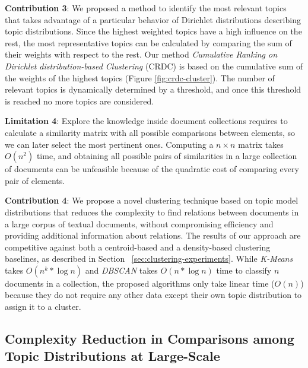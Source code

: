 \textbf{Contribution 3}: We proposed a method to identify the most relevant topics that takes advantage of a particular behavior of Dirichlet distributions describing topic distributions. Since the highest weighted topics have a high influence on the rest, the most representative topics can be calculated by comparing the sum of their weights with respect to the rest. Our method \textit{Cumulative Ranking on Dirichlet distribution-based Clustering} (CRDC) is based on the cumulative sum of the weights of the highest topics (Figure \ref{fig:crdc-cluster}). The number of relevant topics is dynamically determined by a threshold, and once this threshold is reached no more topics are considered. 

\textbf{Limitation 4}: Explore the knowledge inside document collections requires to calculate a similarity matrix with all possible comparisons between elements, so we can later select the most pertinent ones. Computing a $n \times n$ matrix takes $O(n^2)$ time, and obtaining all possible pairs of similarities in a large collection of documents can be unfeasible because of the quadratic cost of comparing every pair of elements.

\textbf{Contribution 4}: We propose a novel clustering technique based on topic model distributions that reduces the complexity to find relations between documents in a large corpus of textual documents, without compromising efficiency and providing additional information about relations. The results of our approach are competitive against both a centroid-based and a density-based clustering baselines, as described in Section ~\ref{sec:clustering-experiments}. While \textit{K-Means} takes $O(n^k * \log{n})$ and \textit{DBSCAN} takes $O(n * \log{n})$ time to classify $n$ documents in a collection, the proposed algorithms only take linear time ($O(n)$) because they do not require any other data except their own topic distribution to assign it to a cluster.

\subsection{Complexity Reduction in Comparisons among Topic Distributions at Large-Scale}

